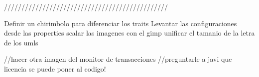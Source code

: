 ///////////////////////////////////////////////


Definir un chirimbolo para diferenciar los traits 
Levantar las configuraciones desde las properties
scalar las imagenes con el gimp
unificar el tamanio de la letra de los umls

//hacer otra imagen del monitor de transacciones
//preguntarle a javi que licencia se puede poner al codigo!  